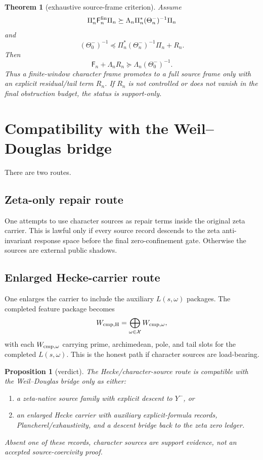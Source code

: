 \documentclass[11pt]{article}
\newtheorem{theorem}{Theorem}
\newtheorem{proposition}{Proposition}
\newcommand{\cF}{\mathsf F}
\newcommand{\cX}{\mathcal X}
\begin{document}
\begin{theorem}[exhaustive source-frame criterion]
Assume
\[
  \Pi_n^*\cF_n^{\rm fin}\Pi_n\succeq \Lambda_n \Pi_n^*(\Theta_n^-)^{-1}\Pi_n
\]
and
\[
  (\Theta_0^-)^{-1}\preceq \Pi_n^*(\Theta_n^-)^{-1}\Pi_n+R_n.
\]
Then
\[
  \cF_n + \Lambda_n R_n\succeq \Lambda_n(\Theta_0^-)^{-1}.
\]
Thus a finite-window character frame promotes to a full source frame only with an explicit residual/tail term \(R_n\).  If \(R_n\) is not controlled or does not vanish in the final obstruction budget, the status is support-only.
\end{theorem}

\section{Compatibility with the Weil--Douglas bridge}
There are two routes.

\subsection{Zeta-only repair route}
One attempts to use character sources as repair terms inside the original zeta carrier.  This is lawful only if every source record descends to the zeta anti-invariant response space before the final zero-confinement gate.  Otherwise the sources are external public shadows.

\subsection{Enlarged Hecke-carrier route}
One enlarges the carrier to include the auxiliary \(L(s,\omega)\) packages.  The completed feature package becomes
\[
  W_{\rm cmp,H}=\bigoplus_{\omega\in\cX} W_{{\rm cmp},\omega},
\]
with each \(W_{{\rm cmp},\omega}\) carrying prime, archimedean, pole, and tail slots for the completed \(L(s,\omega)\).  This is the honest path if character sources are load-bearing.

\begin{proposition}[verdict]
The Hecke/character-source route is compatible with the Weil--Douglas bridge only as either:
\begin{enumerate}[label=(\roman*)]
\item a zeta-native source family with explicit descent to \(Y^-\), or
\item an enlarged Hecke carrier with auxiliary explicit-formula records, Plancherel/exhaustivity, and a descent bridge back to the zeta zero ledger.
\end{enumerate}
Absent one of these records, character sources are support evidence, not an accepted source-coercivity proof.
\end{proposition}
\end{document}
